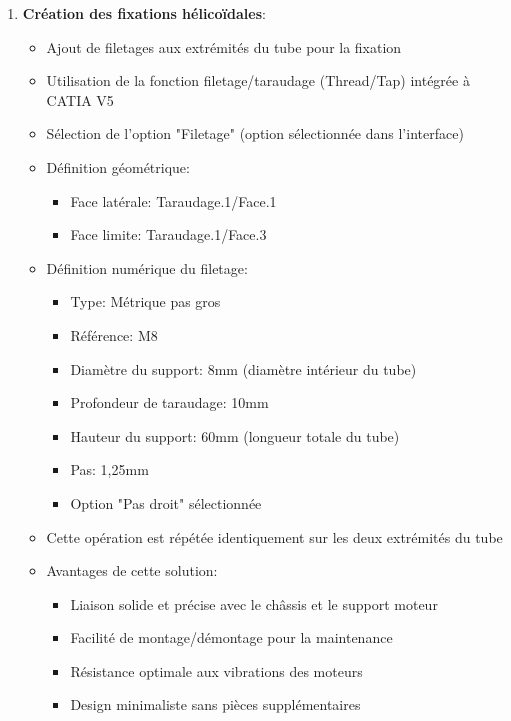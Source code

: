 \documentclass[a4paper,12pt]{report}
\begin{document}
\begin{enumerate}
    \item \textbf{Création des fixations hélicoïdales}:
    \begin{itemize}
        \item Ajout de filetages aux extrémités du tube pour la fixation
        \item Utilisation de la fonction filetage/taraudage (Thread/Tap) intégrée à CATIA V5
        \item Sélection de l'option "Filetage" (option sélectionnée dans l'interface)
        \item Définition géométrique:
        \begin{itemize}
            \item Face latérale: Taraudage.1/Face.1
            \item Face limite: Taraudage.1/Face.3
        \end{itemize}
        \item Définition numérique du filetage:
        \begin{itemize}
            \item Type: Métrique pas gros
            \item Référence: M8
            \item Diamètre du support: 8mm (diamètre intérieur du tube)
            \item Profondeur de taraudage: 10mm
            \item Hauteur du support: 60mm (longueur totale du tube)
            \item Pas: 1,25mm
            \item Option "Pas droit" sélectionnée
        \end{itemize}
        \item Cette opération est répétée identiquement sur les deux extrémités du tube
        \item Avantages de cette solution:
        \begin{itemize}
            \item Liaison solide et précise avec le châssis et le support moteur
            \item Facilité de montage/démontage pour la maintenance
            \item Résistance optimale aux vibrations des moteurs
            \item Design minimaliste sans pièces supplémentaires
        \end{itemize}
    \end{itemize}
    

\end{enumerate}
\end{document}
